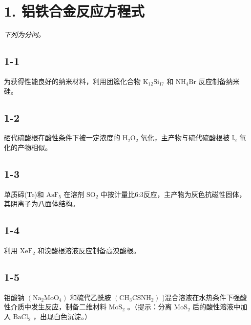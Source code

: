 \section*{1. 铝铁合金反应方程式}
\textit{下列为分问。}

\subsection*{1-1}
为获得性能良好的纳⽶材料，利⽤团簇化合物 $\mathrm { K _ { 1 2 } S i _ { 1 7 } }$ 和 $\mathrm { N H _ { 4 } B r }$ 反应制备纳⽶硅。

\subsection*{1-2}
硒代硫酸根在酸性条件下被⼀定浓度的 $\mathrm { H _ { 2 } O _ { 2 } }$ 氧化，主产物与硫代硫酸根被 $\mathrm { I } _ { 2 }$ 氧化的产物相似。

\subsection*{1-3}
单质碲(Te)和 $\mathrm { A s F _ { 5 } }$ 在溶剂 $\mathrm { S O } _ { 2 }$ 中按计量⽐6:3反应，主产物为灰⾊抗磁性固体，其阴离⼦为⼋⾯体结构。

\subsection*{1-4}
利⽤ $\mathrm { X e F _ { 2 } }$ 和溴酸根溶液反应制备⾼溴酸根。

\subsection*{1-5}
钼酸钠 $\left( \mathrm { N a _ { 2 } M o O _ { 4 } } \right)$ 和硫代⼄酰胺 $\mathrm { ( C H _ { 3 } C S N H _ { 2 } ) }$ )混合溶液在⽔热条件下强酸性介质中发⽣反应，制备⼆维材料 $\mathrm { M o S } _ { 2 }$ 。（提⽰：分离 $\mathrm { M o S _ { 2 } }$ 后的酸性溶液中加⼊ $\mathrm { B a C l _ { 2 } }$ ，出现⽩⾊沉淀。）
